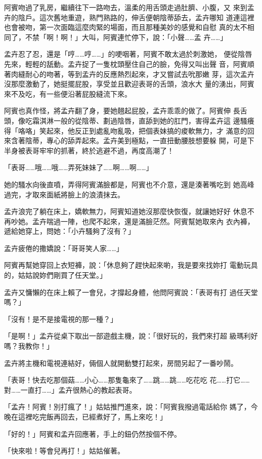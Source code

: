阿賓吻過了乳房，繼續往下一路吻去，溫柔的用舌頭走過肚臍、小腹，又
來到孟卉的陰戶。這次舊地重遊，熟門熟路的，伸舌便朝陰蒂舔去，孟卉哪知
道連這裡也會被吻，第一次面臨這麼肉緊的場面，而且那種美妙的感覺和自慰
真的太不相同了，不禁「啊！啊！」大叫，阿賓連忙停下，說：「小聲……孟
卉……」

孟卉忍了忍，還是「哼……哼……」的哽咽著，阿賓不敢太過於刺激她，
便從陰唇先來，輕輕的舐動。孟卉捉了一隻枕頭壓住自己的臉，免得又叫出聲
音，阿賓順著肉縫耐心的吻著，等到孟卉的反應熱烈起來，才又嘗試去吮那嫩
芽，這次孟卉沒那麼激動了，她挺擺屁股，享受並且歡迎表哥的舌頭，浪水大
量的湧出，阿賓來不及吃，有一些便沿著屁股縫流下來。

阿賓也真作怪，將孟卉翻了身，要她翹起屁股，孟卉乖乖的做了。阿賓伸
長舌頭，像吃霜淇淋一般的從陰蒂、劃過陰唇，直舔到她的肛門，害得孟卉這
邊騷癢得「咯咯」笑起來，他反正到處亂吻亂吸，把個表妹搞的痠軟無力，才
滿意的回來含著陰蒂，專心的舔弄起來。孟卉美到極點，一直扭動腰肢想要躲
開，可是下半身被表哥牢牢的抓著，終於逃避不過，再度高潮了！

「表哥……哦……哦……弄死妹妹了……啊……啊……」

她的騷水向後直噴，弄得阿賓滿臉都是，阿賓也不介意，還是湊著嘴吃到
她高峰過完，才取來面紙將臉上的浪漬抹去。

孟卉浪完了躺在床上，嬌軟無力，阿賓知道她沒那麼快恢復，就讓她好好
休息不再吵她。孟卉喘過一陣，也爬不起來，還是滿臉茫然。阿賓幫她取來內
衣內褲，遞給她穿上，問她：「小卉騷夠了沒有？」

孟卉疲倦的撒嬌說：「哥哥笑人家……」

阿賓再幫她穿回上衣短褲，說：「休息夠了趕快起來喲，我是要來找妳打
電動玩具的，姑姑說妳們剛買了任天堂。」

孟卉又慵懶的在床上賴了一會兒，才撐起身體，他問阿賓說：「表哥有打
過任天堂嗎？」

「沒有！是不是接電視的那一種？」

「是啊！」孟卉從桌下取出一部遊戲主機，說：「很好玩的，我們來打超
級瑪利好嗎？我教你！」

孟卉將主機和電視連結好，倆個人就開動雙打起來，房間另起了一番吵鬧。

「表哥！快去吃那個菇……小心……那隻龜來了……跳……跳……吃花吃
花……打它……對……一直打……」孟卉很熱心的教起表哥。

「孟卉！阿賓！別打瘋了！」姑姑推門進來，說：「阿賓我撥過電話給你
媽了，今晚在這裡吃完飯再回去，已經煮好了，馬上來吃！」

「好的！」阿賓和孟卉回應著，手上的鈕仍然按個不停。

「快來啦！等會兒再打！」姑姑催著。

